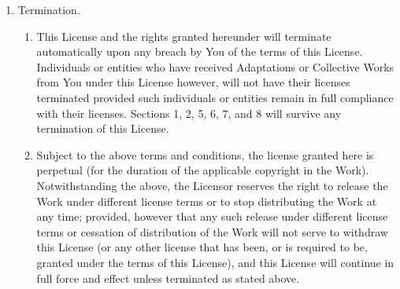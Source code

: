 \begin{enumerate}
    
    \item{Termination.}
      \begin{enumerate}
       \item {This License and the rights granted hereunder will terminate automatically upon any breach by You of the terms of this License. Individuals or entities who have received Adaptations or Collective Works from You under this License however, will not have their licenses terminated provided such individuals or entities remain in full compliance with their licenses. Sections 1, 2, 5, 6, 7, and 8 will survive any termination of this License.}
	\item{Subject to the above terms and conditions, the license granted here is perpetual (for the duration of the applicable copyright in the Work). Notwithstanding the above, the Licensor reserves the right to release the Work under different license terms or to stop distributing the Work at any time; provided, however that any such release under different license terms or cessation of distribution of the Work will not serve to withdraw this License (or any other license that has been, or is required to be, granted under the terms of this License), and this License will continue in full force and effect unless terminated as stated above.}
      \end{enumerate}


\end{enumerate}

